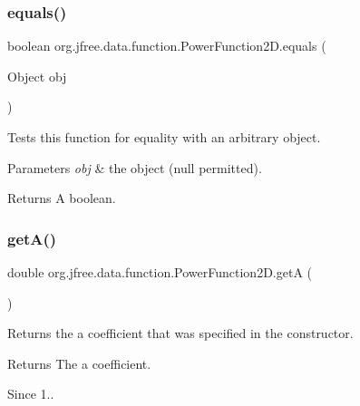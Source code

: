 \subsubsection{\texorpdfstring{equals()}{equals()}}
{\footnotesize\ttfamily boolean org.\+jfree.\+data.\+function.\+Power\+Function2\+D.\+equals (\begin{DoxyParamCaption}\item[{Object}]{obj }\end{DoxyParamCaption})}

Tests this function for equality with an arbitrary object.


\begin{DoxyParams}{Parameters}
{\em obj} & the object ({\ttfamily null} permitted).\\
\hline
\end{DoxyParams}
\begin{DoxyReturn}{Returns}
A boolean. 
\end{DoxyReturn}
\mbox{\label{classorg_1_1jfree_1_1data_1_1function_1_1_power_function2_d_a838076a4dd8be578d2831597b6344b58}} 
\subsubsection{\texorpdfstring{get\+A()}{getA()}}
{\footnotesize\ttfamily double org.\+jfree.\+data.\+function.\+Power\+Function2\+D.\+getA (\begin{DoxyParamCaption}{ }\end{DoxyParamCaption})}

Returns the \textquotesingle{}a\textquotesingle{} coefficient that was specified in the constructor.

\begin{DoxyReturn}{Returns}
The \textquotesingle{}a\textquotesingle{} coefficient.
\end{DoxyReturn}
\begin{DoxySince}{Since}
1.. 
\end{DoxySince}
\mbox{\label{classorg_1_1jfree_1_1data_1_1function_1_1_power_function2_d_ad872da611f29ba94f8a1466e79937ddb}} 
